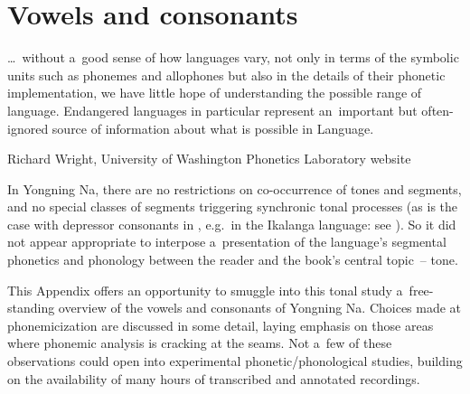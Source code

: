 \chapter{Vowels and consonants} 
\label{chap:appendixa}
\label{chap:vowelsandconsonants}


\epigraph{{\dots}~without a~good sense of how languages vary, not only in terms of the symbolic units such as phonemes and allophones but also in the details of their phonetic implementation, we have little hope of understanding the possible range of language. Endangered languages in particular represent an~important but often-ignored source of information about what is possible in Language.}{Richard Wright, University of Washington Phonetics Laboratory website}

{\noindent}In Yongning Na, there are no restrictions on co-occurrence of tones and segments, and no special classes of segments triggering synchronic tonal processes (as is the case with depressor consonants in , e.g.~in the Ikalanga language: see \citealt{hymanetal1998}). So it did not appear appropriate to interpose a~presentation of the language's segmental phonetics and phonology between the reader and the book's central topic~-- tone.

This Appendix offers an opportunity to smuggle into this tonal study a~free-standing overview of the vowels and consonants of Yongning Na. Choices made at phonemicization are discussed in some detail, laying emphasis on those areas where phonemic analysis is cracking at the seams. Not a~few of these observations could open into experimental phonetic/phonological studies, building on the availability of many hours of transcribed and annotated recordings.


\label{sec:introductionnophonologicalalternationsrichcoarticulatoryphenomena}

